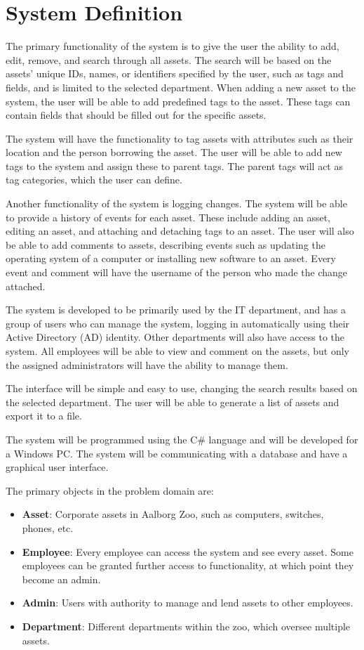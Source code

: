 \section{System Definition}\label{sc:SystemDefinition}
The primary functionality of the system is to give the user the ability to add, edit, remove, and search through all assets. The search will be based on the assets' unique IDs, names, or identifiers specified by the user, such as tags and fields, and is limited to the selected department. When adding a new asset to the system, the user will be able to add predefined tags to the asset. These tags can contain fields that should be filled out for the specific assets.
\par
The system will have the functionality to tag assets with attributes such as their location and the person borrowing the asset. The user will be able to add new tags to the system and assign these to parent tags. The parent tags will act as tag categories, which the user can define. 
\par
Another functionality of the system is logging changes. The system will be able to provide a history of events for each asset. These include adding an asset, editing an asset, and attaching and detaching tags to an asset. The user will also be able to add comments to assets, describing events such as updating the operating system of a computer or installing new software to an asset. Every event and comment will have the username of the person who made the change attached.
\par
The system is developed to be primarily used by the IT department, and has a group of users who can manage the system, logging in automatically using their Active Directory (AD) identity. Other departments will also have access to the system. All employees will be able to view and comment on the assets, but only the assigned administrators will have the ability to manage them. 
\par
The interface will be simple and easy to use, changing the search results based on the selected department. The user will be able to generate a list of assets and export it to a file.
\par
The system will be programmed using the C\# language and will be developed for a Windows PC. The system will be communicating with a database and have a graphical user interface.
\par
The primary objects in the problem domain are:
\begin{itemize}
    \item \textbf{Asset}: Corporate assets in Aalborg Zoo, such as computers, switches, phones, etc.
    
    \item \textbf{Employee}: Every employee can access the system and see every asset. Some employees can be granted further access to functionality, at which point they become an admin.
    
    \item \textbf{Admin}: Users with authority to manage and lend assets to other employees.
    
    \item \textbf{Department}: Different departments within the zoo, which oversee multiple assets.
\end{itemize}
